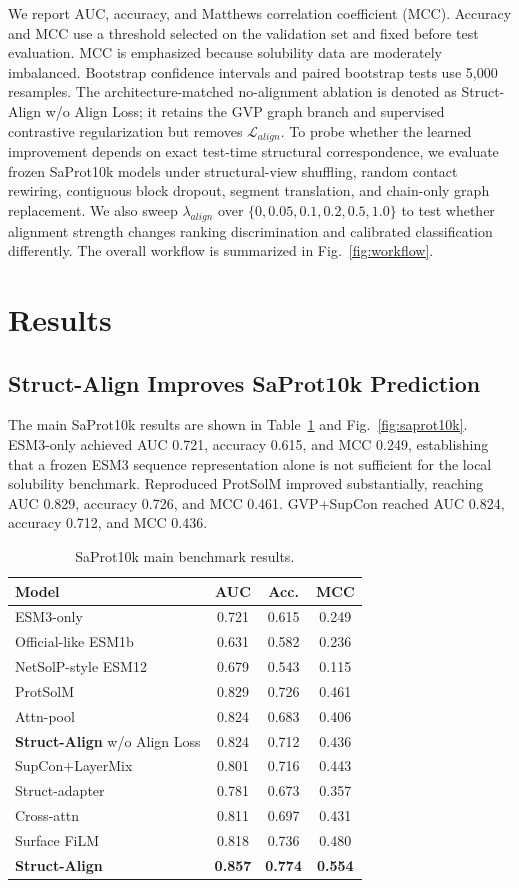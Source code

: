 \documentclass[conference]{IEEEtran}
\begin{document}
We report AUC, accuracy, and Matthews correlation coefficient (MCC). Accuracy and MCC use a threshold selected on the validation set and fixed before test evaluation. MCC is emphasized because solubility data are moderately imbalanced. Bootstrap confidence intervals and paired bootstrap tests use 5,000 resamples. The architecture-matched no-alignment ablation is denoted as Struct-Align w/o Align Loss; it retains the GVP graph branch and supervised contrastive regularization but removes $\mathcal{L}_{align}$. To probe whether the learned improvement depends on exact test-time structural correspondence, we evaluate frozen SaProt10k models under structural-view shuffling, random contact rewiring, contiguous block dropout, segment translation, and chain-only graph replacement. We also sweep $\lambda_{align}$ over $\{0,0.05,0.1,0.2,0.5,1.0\}$ to test whether alignment strength changes ranking discrimination and calibrated classification differently. The overall workflow is summarized in Fig.~\ref{fig:workflow}.

\section{Results}

\subsection{Struct-Align Improves SaProt10k Prediction}
The main SaProt10k results are shown in Table~\ref{tab:saprot} and Fig.~\ref{fig:saprot10k}. ESM3-only achieved AUC 0.721, accuracy 0.615, and MCC 0.249, establishing that a frozen ESM3 sequence representation alone is not sufficient for the local solubility benchmark. Reproduced ProtSolM improved substantially, reaching AUC 0.829, accuracy 0.726, and MCC 0.461. GVP+SupCon reached AUC 0.824, accuracy 0.712, and MCC 0.436.

\begin{table}[!t]
\centering
\caption{SaProt10k main benchmark results.}
\label{tab:saprot}
\begin{tabular}{lccc}
\toprule
Model & AUC & Acc. & MCC \\
\midrule
ESM3-only & 0.721 & 0.615 & 0.249 \\
Official-like ESM1b & 0.631 & 0.582 & 0.236 \\
NetSolP-style ESM12 & 0.679 & 0.543 & 0.115 \\
ProtSolM & 0.829 & 0.726 & 0.461 \\
Attn-pool & 0.824 & 0.683 & 0.406 \\
\textbf{Struct-Align} w/o Align Loss & 0.824 & 0.712 & 0.436 \\
SupCon+LayerMix & 0.801 & 0.716 & 0.443 \\
Struct-adapter & 0.781 & 0.673 & 0.357 \\
Cross-attn & 0.811 & 0.697 & 0.431 \\
Surface FiLM & 0.818 & 0.736 & 0.480 \\
\rowcolor{gray!12}\textbf{Struct-Align} & \textbf{0.857} & \textbf{0.774} & \textbf{0.554} \\
\bottomrule
\end{tabular}
\end{table}
\end{document}
